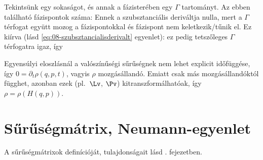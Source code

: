    Tekintsünk egy sokaságot, és annak a fázisterében egy $\Gamma$ tartományt.
   Az ebben található fázispontok száma:
   Ennek a szubsztanciális deriváltja nulla, mert a $\Gamma$ térfogat együtt mozog a fázispontokkal és fázispont nem keletkezik/tűnik el.
   Ez kiírva (lásd \eqref{eq:08-szubsztancialisderivalt} egyenlet):
   ez pedig tetszőleges $\Gamma$ térfogatra igaz, így 
   
   Egyensúlyi eloszlásnál a valószínűségi sűrűségnek nem lehet explicit időfüggése, így $0=\partial_t\rho(q,p,t)$, vagyis $\rho$ mozgásállandó.
   Emiatt csak más mozgásállandóktól függhet, azonban ezek (pl.\ $\Lv$, $\Pv$) kitranszformálhatóak, így $\rho=\rho(H(q,p))$. 

 \section{Sűrűségmátrix, Neumann-egyenlet}
  
  A sűrűségmátrixok definícióját, tulajdonságait lásd . fejezetben. 
  
